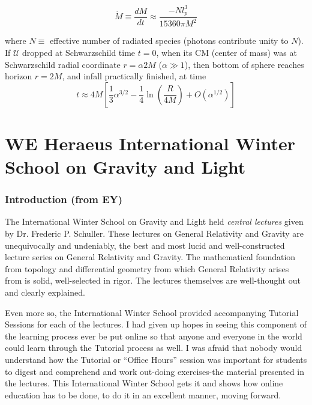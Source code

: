 \documentclass[10pt]{amsart}
\begin{document}
\begin{multicols*}{2}
\begin{equation}
	\dot{M} \equiv \frac{dM}{dt} \approx \frac{ - Nl_p^3}{ 15360 \pi M^2}
\end{equation}

where $N\equiv $ effective number of radiated species (photons contribute unity to $N$). \\
If $\mathcal{U}$ dropped at Schwarzschild time $t=0$, when its CM (center of mass) was at Schwarzschild radial coordinate $r = \alpha 2M$ ($\alpha \gg 1$), then bottom of sphere reaches horizon $r= 2M$, and infall practically finished, at time 
\begin{equation}
	t \approx 4 M \left[ \frac{1}{3} \alpha^{3/2} - \frac{1}{4} \ln{ \left( \frac{R}{ 4M } \right) } + O(\alpha^{1/2}) \right] 
\end{equation}



\part{WE Heraeus International Winter School on Gravity and Light}

\section*{Introduction (from EY)}

The International Winter School on Gravity and Light held \emph{central lectures} given by Dr. Frederic P. Schuller. These lectures on General Relativity and Gravity are unequivocally and undeniably, the best and most lucid and well-constructed lecture series on General Relativity and Gravity.  The mathematical foundation from topology and differential geometry from which General Relativity arises from is solid, well-selected in rigor.  The lectures themselves are well-thought out and clearly explained.  

Even more so, the International Winter School provided accompanying Tutorial Sessions for each of the lectures.  I had given up hopes in seeing this component of the learning process ever be put online so that anyone and everyone in the world could learn through the Tutorial process as well.  I was afraid that nobody would understand how the Tutorial or ``Office Hours'' session was important for students to digest and comprehend and work out-doing exercises-the material presented in the lectures.  This International Winter School gets it and shows how online education has to be done, to do it in an excellent manner, moving forward.  


\end{multicols*}
\end{document}

